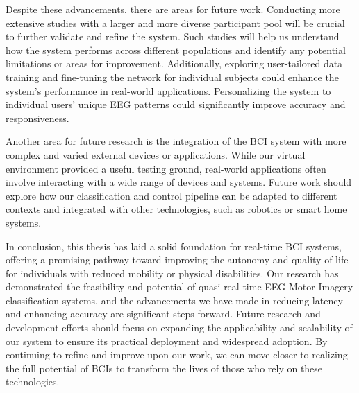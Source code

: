 Despite these advancements, there are areas for future work. 
Conducting more extensive studies with a larger and more diverse participant pool will be crucial to further validate and refine the system.
Such studies will help us understand how the system performs across different populations and identify any potential limitations or areas for improvement. 
Additionally, exploring user-tailored data training and fine-tuning the network for individual subjects could enhance the system's performance in real-world applications. 
Personalizing the system to individual users' unique EEG patterns could significantly improve accuracy and responsiveness.

Another area for future research is the integration of the BCI system with more complex and varied external devices or applications. 
While our virtual environment provided a useful testing ground, real-world applications often involve interacting with a wide range of devices and systems. 
Future work should explore how our classification and control pipeline can be adapted to different contexts and integrated with other technologies, such as robotics or smart home systems.

In conclusion, this thesis has laid a solid foundation for real-time BCI systems, offering a promising pathway toward improving the autonomy and quality of life for individuals with reduced mobility or physical disabilities. 
Our research has demonstrated the feasibility and potential of quasi-real-time EEG Motor Imagery classification systems, and the advancements we have made in reducing latency and enhancing accuracy are significant steps forward. 
Future research and development efforts should focus on expanding the applicability and scalability of our system to ensure its practical deployment and widespread adoption. 
By continuing to refine and improve upon our work, we can move closer to realizing the full potential of BCIs to transform the lives of those who rely on these technologies.
